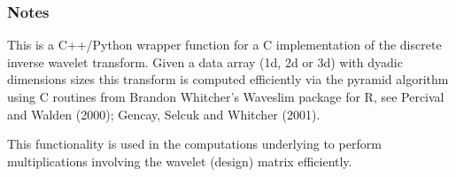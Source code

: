 \documentclass[letterpaper,10pt,english]{sphinxmanual}
\begin{document}
\begin{fulllineitems}
\subsubsection*{Notes}

\sphinxAtStartPar
This is a C++/Python wrapper function for a C implementation of the
discrete inverse wavelet transform. Given a data array (1d, 2d or 3d) with dyadic
dimensions sizes this transform is computed efficiently via the pyramid
algorithm using C routines from  Brandon Whitcher’s Waveslim package for R, see
Percival and Walden (2000); Gencay, Selcuk and Whitcher (2001).

\sphinxAtStartPar
This functionality is used in the computations underlying 
to perform multiplications involving the wavelet (design) matrix efficiently.

\end{fulllineitems}

\end{document}

